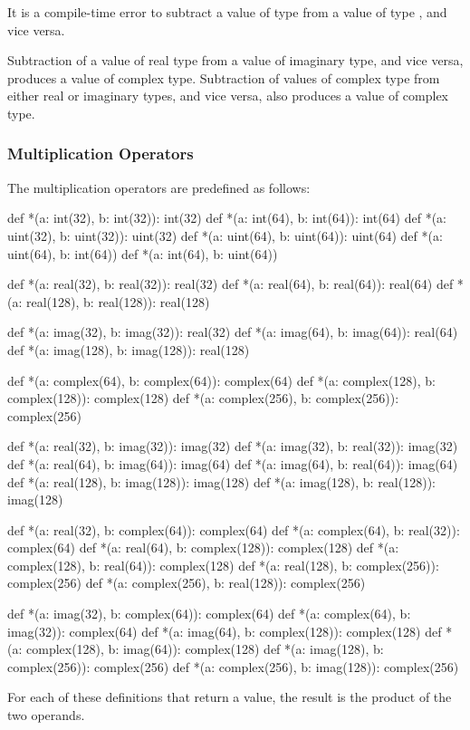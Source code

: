 It is a compile-time error to subtract a value of type 
from a value of type , and vice versa.

Subtraction of a value of real type from a value of imaginary type,
and vice versa, produces a value of complex type.  Subtraction of
values of complex type from either real or imaginary types, and vice
versa, also produces a value of complex type.

\subsubsection{Multiplication Operators}
\label{Multiplication_Operators}

The multiplication operators are predefined as follows:
\begin{chapel}
def *(a: int(32), b: int(32)): int(32)
def *(a: int(64), b: int(64)): int(64)
def *(a: uint(32), b: uint(32)): uint(32)
def *(a: uint(64), b: uint(64)): uint(64)
def *(a: uint(64), b: int(64))
def *(a: int(64), b: uint(64))

def *(a: real(32), b: real(32)): real(32)
def *(a: real(64), b: real(64)): real(64)
def *(a: real(128), b: real(128)): real(128)

def *(a: imag(32), b: imag(32)): real(32)
def *(a: imag(64), b: imag(64)): real(64)
def *(a: imag(128), b: imag(128)): real(128)

def *(a: complex(64), b: complex(64)): complex(64)
def *(a: complex(128), b: complex(128)): complex(128)
def *(a: complex(256), b: complex(256)): complex(256)

def *(a: real(32), b: imag(32)): imag(32)
def *(a: imag(32), b: real(32)): imag(32)
def *(a: real(64), b: imag(64)): imag(64)
def *(a: imag(64), b: real(64)): imag(64)
def *(a: real(128), b: imag(128)): imag(128)
def *(a: imag(128), b: real(128)): imag(128)

def *(a: real(32), b: complex(64)): complex(64)
def *(a: complex(64), b: real(32)): complex(64)
def *(a: real(64), b: complex(128)): complex(128)
def *(a: complex(128), b: real(64)): complex(128)
def *(a: real(128), b: complex(256)): complex(256)
def *(a: complex(256), b: real(128)): complex(256)

def *(a: imag(32), b: complex(64)): complex(64)
def *(a: complex(64), b: imag(32)): complex(64)
def *(a: imag(64), b: complex(128)): complex(128)
def *(a: complex(128), b: imag(64)): complex(128)
def *(a: imag(128), b: complex(256)): complex(256)
def *(a: complex(256), b: imag(128)): complex(256)
\end{chapel}
For each of these definitions that return a value, the result is the
product of the two operands.

